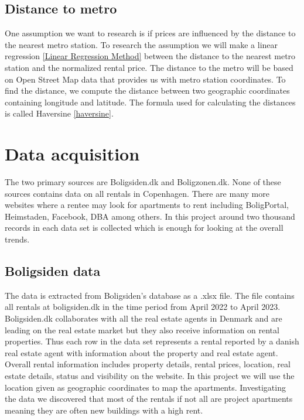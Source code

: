 \documentclass{article}
\begin{document}
\subsection{Distance to metro}
One assumption we want to research is if prices are influenced by the distance to the nearest metro station. To research the assumption we will make a linear regression \ref{Linear Regression Method} between the distance to the nearest metro station and the normalized rental price. The distance to the metro will be based on Open Street Map data that provides us with metro station coordinates. To find the distance, we compute the distance between two geographic coordinates containing longitude and latitude. The formula used for calculating the distances is called Haversine \ref{haversine}. 

\section{Data acquisition}

The two primary sources are Boligsiden.dk and Boligzonen.dk. None of these sources contains data on all rentals in Copenhagen. There are many more websites where a rentee may look for apartments to rent including BoligPortal, Heimstaden, Facebook, DBA among others. In this project around two thousand records in each data set is collected which is enough for looking at the overall trends. 

\subsection{Boligsiden data}
The data is extracted from Boligsiden's database as a .xlsx file. The file contains all rentals at boligsiden.dk in the time period from April 2022 to April 2023. Boligsiden.dk collaborates with all the real estate agents in Denmark and are leading on the real estate market but they also receive information on rental properties. Thus each row in the data set represents a rental reported by a danish real estate agent with information about the property and real estate agent. Overall rental information includes property details, rental prices, location, real estate details, status and visibility on the website. In this project we will use the location given as geographic coordinates to map the apartments. Investigating the data we discovered that most of the rentals if not all are project apartments meaning they are often new buildings with a high rent. 
\end{document}
